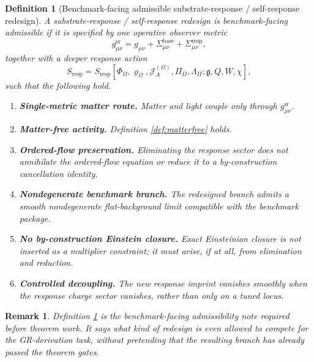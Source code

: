 \documentclass[11pt]{article}
\newcommand{\BridgeMetric}{\mathfrak g}
\newcommand{\ObserverMetric}{g_{\mu\nu}}
\newcommand{\RedesignMetric}{g_{\mu\nu}^{\mathrm{sr}}}
\newcommand{\BaseShift}{\Sigma_{\mu\nu}^{\mathrm{base}}}
\newcommand{\ResponseShift}{\Sigma_{\mu\nu}^{\mathrm{resp}}}
\newcommand{\ResponseAction}{S_{\mathrm{resp}}}
\newcommand{\SourceDensity}{\varrho_\Omega}
\newcommand{\SourceCurrent}{\mathcal J^{(\Omega)}}
\newcommand{\FlowPot}{\Phi_\Omega}
\newcommand{\BalanceField}{\Pi_\Omega}
\newcommand{\BalMult}{\Lambda_\Pi}
\newtheorem{definition}{Definition}
\newtheorem{remark}{Remark}
\begin{document}
\begin{definition}[Benchmark-facing admissible substrate-response / self-response redesign]
\label{def:admissible}
A substrate-response / self-response redesign is \emph{benchmark-facing admissible} if it is specified by one operative observer metric
\begin{equation}
\RedesignMetric
=
\ObserverMetric
+\BaseShift
+\ResponseShift,
\label{eq:gsr}
\end{equation}
together with a deeper response action
\begin{equation}
\ResponseAction
=
\ResponseAction[\FlowPot,\SourceDensity,\SourceCurrent_A,\BalanceField,\BalMult;\BridgeMetric,Q,W,\chi],
\label{eq:sresp}
\end{equation}
such that the following hold.
\begin{enumerate}
    \item \textbf{Single-metric matter route.} Matter and light couple only through \(\RedesignMetric\).
    \item \textbf{Matter-free activity.} Definition \ref{def:matterfree} holds.
    \item \textbf{Ordered-flow preservation.} Eliminating the response sector does not annihilate the ordered-flow equation or reduce it to a by-construction cancellation identity.
    \item \textbf{Nondegenerate benchmark branch.} The redesigned branch admits a smooth nondegenerate flat-background limit compatible with the benchmark package.
    \item \textbf{No by-construction Einstein closure.} Exact Einsteinian closure is not inserted as a multiplier constraint; it must arise, if at all, from elimination and reduction.
    \item \textbf{Controlled decoupling.} The new response imprint vanishes smoothly when the response charge sector vanishes, rather than only on a tuned locus.
\end{enumerate}
\end{definition}

\begin{remark}
Definition \ref{def:admissible} is the benchmark-facing admissibility note required before theorem work. It says what kind of redesign is even allowed to compete for the GR-derivation task, without pretending that the resulting branch has already passed the theorem gates.
\end{remark}
\end{document}
